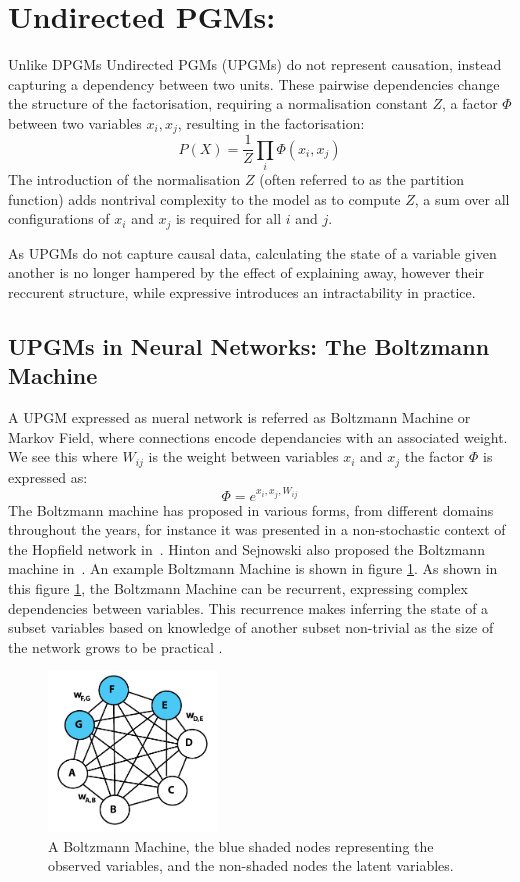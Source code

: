 \section{Undirected PGMs:}

Unlike DPGMs Undirected PGMs (UPGMs) do not represent causation, instead capturing a dependency between two units. These pairwise dependencies change the structure of the factorisation, requiring a normalisation constant $Z$, a factor $\Phi$ between two variables $x_i,x_j$, resulting in the factorisation:
$$
P(X) = \frac{1}{Z} \prod_i \Phi(x_i, x_j)
$$
The introduction of the normalisation $Z$ (often referred to as the partition function) adds nontrival complexity to the model as to compute $Z$, a sum over all configurations of $x_i$ and $x_j$ is required for all $i$ and $j$.

As UPGMs do not capture causal data, calculating the state of a variable given another is no longer hampered by the effect of explaining away, however their reccurent structure, while expressive introduces an intractability in practice.

\subsection{UPGMs in Neural Networks: The Boltzmann Machine}
A UPGM expressed as nueral network is referred as Boltzmann Machine or Markov Field, where connections encode dependancies with an associated weight. We see this where $W_{ij}$ is the weight between variables $x_i$ and $x_j$ the factor $\Phi$ is expressed as:
$$
\Phi = e^{x_i,x_j,W_{ij}}
$$
The Boltzmann machine has proposed in various forms, from different domains throughout the years, for instance it was presented in a non-stochastic context of the Hopfield network in~\cite{Hopfield01041982}. Hinton and Sejnowski also proposed the Boltzmann machine in~\cite{geoffreye.hintonterrencej.sejnowski1983}. An example Boltzmann Machine is shown in figure \ref{F:Boltzmann-Machine}. As shown in this figure \ref{F:Boltzmann-Machine}, the Boltzmann Machine can be recurrent, expressing complex dependencies between variables. This recurrence makes inferring the state of a subset variables based on knowledge of another subset non-trivial as the size of the network grows to be practical \todocite{}.
\begin{figure}[h]
\begin{center}
  \includegraphics[width = 0.4\textwidth]{Assets/Boltzmann_Machine.png}
\caption{A Boltzmann Machine, the blue shaded nodes representing the observed variables, and the non-shaded nodes the latent variables.}
\label{F:Boltzmann-Machine}
\end{center}
\end{figure}

